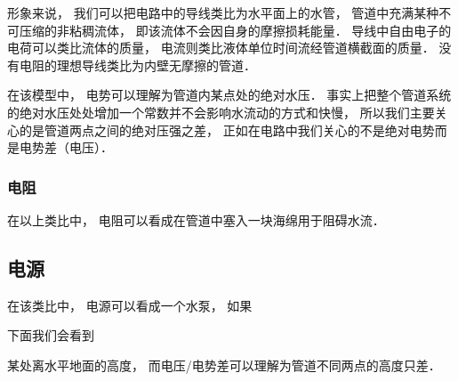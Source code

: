


形象来说， 我们可以把电路中的导线类比为水平面上的水管， 管道中充满某种不可压缩的非粘稠流体， 即该流体不会因自身的摩擦损耗能量． 导线中自由电子的电荷可以类比流体的质量， 电流则类比液体单位时间流经管道横截面的质量． 没有电阻的理想导线类比为内壁无摩擦的管道．

在该模型中， 电势可以理解为管道内某点处的绝对水压． 事实上把整个管道系统的绝对水压处处增加一个常数并不会影响水流动的方式和快慢， 所以我们主要关心的是管道两点之间的绝对压强之差， 正如在电路中我们关心的不是绝对电势而是电势差（电压）．

\subsubsection{电阻}
在以上类比中， 电阻可以看成在管道中塞入一块海绵用于阻碍水流．

\subsection{电源}
在该类比中， 电源可以看成一个水泵， 如果




下面我们会看到

某处离水平地面的高度， 而电压/电势差可以理解为管道不同两点的高度只差．
